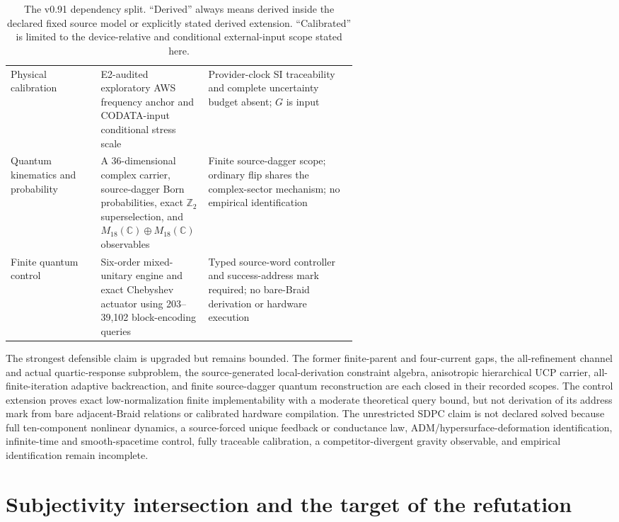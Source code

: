 \documentclass[11pt]{article}
\theoremstyle{definition}
\theoremstyle{remark}
\begin{document}
\begin{table}[ht]
\begin{tabularx}{\linewidth}{>{\raggedright\arraybackslash}p{0.26\linewidth} >{\raggedright\arraybackslash}p{0.31\linewidth} X}
Physical calibration & E2-audited exploratory AWS frequency anchor and CODATA-input conditional stress scale & Provider-clock SI traceability and complete uncertainty budget absent; $G$ is input \\
Quantum kinematics and probability & A 36-dimensional complex carrier, source-dagger Born probabilities, exact $\mathbb Z_2$ superselection, and $M_{18}(\mathbb C)\oplus M_{18}(\mathbb C)$ observables & Finite source-dagger scope; ordinary flip shares the complex-sector mechanism; no empirical identification \\
Finite quantum control & Six-order mixed-unitary engine and exact Chebyshev actuator using 203--39,102 block-encoding queries & Typed source-word controller and success-address mark required; no bare-Braid derivation or hardware execution \\
\bottomrule
\end{tabularx}
\caption{The v0.91 dependency split. ``Derived'' always means derived inside the declared fixed source model or explicitly stated derived extension. ``Calibrated'' is limited to the device-relative and conditional external-input scope stated here.}
\label{tab:delta}
\end{table}

The strongest defensible claim is upgraded but remains bounded. The former finite-parent and four-current gaps, the all-refinement channel and actual quartic-response subproblem, the source-generated local-derivation constraint algebra, anisotropic hierarchical UCP carrier, all-finite-iteration adaptive backreaction, and finite source-dagger quantum reconstruction are each closed in their recorded scopes. The control extension proves exact low-normalization finite implementability with a moderate theoretical query bound, but not derivation of its address mark from bare adjacent-Braid relations or calibrated hardware compilation. The unrestricted SDPC claim is not declared solved because full ten-component nonlinear dynamics, a source-forced unique feedback or conductance law, ADM/hypersurface-deformation identification, infinite-time and smooth-spacetime control, fully traceable calibration, a competitor-divergent gravity observable, and empirical identification remain incomplete.

\section{Subjectivity intersection and the target of the refutation}
\end{document}
